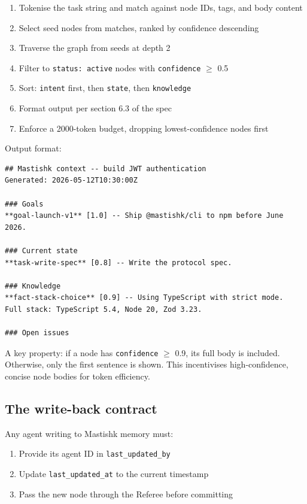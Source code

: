 \documentclass[11pt]{article}
\begin{document}
\begin{enumerate}
  \item Tokenise the task string and match against node IDs, tags, and body content
  \item Select seed nodes from matches, ranked by confidence descending
  \item Traverse the graph from seeds at depth 2
  \item Filter to \texttt{status: active} nodes with \texttt{confidence} $\geq$ 0.5
  \item Sort: \texttt{intent} first, then \texttt{state}, then \texttt{knowledge}
  \item Format output per section 6.3 of the spec
  \item Enforce a 2000-token budget, dropping lowest-confidence nodes first
\end{enumerate}

Output format:

\begin{lstlisting}
## Mastishk context -- build JWT authentication
Generated: 2026-05-12T10:30:00Z

### Goals
**goal-launch-v1** [1.0] -- Ship @mastishk/cli to npm before June 2026.

### Current state
**task-write-spec** [0.8] -- Write the protocol spec.

### Knowledge
**fact-stack-choice** [0.9] -- Using TypeScript with strict mode.
Full stack: TypeScript 5.4, Node 20, Zod 3.23.

### Open issues
\end{lstlisting}

A key property: if a node has \texttt{confidence} $\geq$ 0.9, its full body is included. Otherwise, only the first sentence is shown. This incentivises high-confidence, concise node bodies for token efficiency.

\subsection{The write-back contract}

Any agent writing to Mastishk memory must:

\begin{enumerate}
  \item Provide its agent ID in \texttt{last\_updated\_by}
  \item Update \texttt{last\_updated\_at} to the current timestamp
  \item Pass the new node through the Referee before committing
\end{enumerate}
\end{document}
